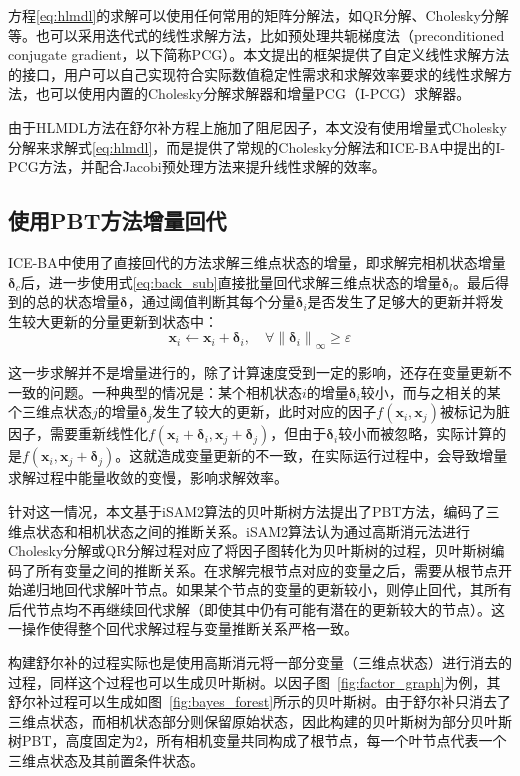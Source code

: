 方程\eqref{eq:hlmdl}的求解可以使用任何常用的矩阵分解法，如QR分解、Cholesky分解等。也可以采用迭代式的线性求解方法，比如预处理共轭梯度法（preconditioned conjugate gradient，以下简称PCG）。本文提出的框架提供了自定义线性求解方法的接口，用户可以自己实现符合实际数值稳定性需求和求解效率要求的线性求解方法，也可以使用内置的Cholesky分解求解器和增量PCG（I-PCG）求解器。

由于HLMDL方法在舒尔补方程上施加了阻尼因子，本文没有使用增量式Cholesky分解\citep{polok2013incremental}来求解式\eqref{eq:hlmdl}，而是提供了常规的Cholesky分解法和ICE-BA中提出的I-PCG方法，并配合Jacobi预处理方法\citep{jeong2012pushing}来提升线性求解的效率。

\subsection{使用PBT方法增量回代}

ICE-BA中使用了直接回代的方法求解三维点状态的增量，即求解完相机状态增量$\bm{\delta}_c$后，进一步使用式\eqref{eq:back_sub}直接批量回代求解三维点状态的增量$\bm{\delta}_l$。最后得到的总的状态增量$\bm{\delta}$，通过阈值判断其每个分量$\bm{\delta}_i$是否发生了足够大的更新并将发生较大更新的分量更新到状态中：
\begin{equation}
    \bm{x}_i \leftarrow \bm{x}_i + \bm{\delta}_i, \quad
    \forall \left\|\bm{\delta}_i\right\|_{\infty} \geq \varepsilon
\end{equation}

这一步求解并不是增量进行的，除了计算速度受到一定的影响，还存在变量更新不一致的问题。一种典型的情况是：某个相机状态$i$的增量$\bm{\delta}_i$较小，而与之相关的某个三维点状态$j$的增量$\bm{\delta}_{j}$发生了较大的更新，此时对应的因子$f(\bm{x}_i,\bm{x}_j)$被标记为脏因子，需要重新线性化$f(\bm{x}_i+\bm{\delta}_i,\bm{x}_j+\bm{\delta}_j)$，但由于$\bm{\delta}_i$较小而被忽略，实际计算的是$f(\bm{x}_i,\bm{x}_j+\bm{\delta}_j)$。这就造成变量更新的不一致，在实际运行过程中，会导致增量求解过程中能量收敛的变慢，影响求解效率。

针对这一情况，本文基于iSAM2算法的贝叶斯树方法提出了PBT方法，编码了三维点状态和相机状态之间的推断关系。iSAM2算法认为通过高斯消元法进行Cholesky分解或QR分解过程对应了将因子图转化为贝叶斯树的过程，贝叶斯树编码了所有变量之间的推断关系。在求解完根节点对应的变量之后，需要从根节点开始递归地回代求解叶节点。如果某个节点的变量的更新较小，则停止回代，其所有后代节点均不再继续回代求解（即使其中仍有可能有潜在的更新较大的节点）。这一操作使得整个回代求解过程与变量推断关系严格一致。

构建舒尔补的过程实际也是使用高斯消元将一部分变量（三维点状态）进行消去的过程，同样这个过程也可以生成贝叶斯树。以因子图~\ref{fig:factor_graph}为例，其舒尔补过程可以生成如图~\ref{fig:bayes_forest}所示的贝叶斯树。由于舒尔补只消去了三维点状态，而相机状态部分则保留原始状态，因此构建的贝叶斯树为部分贝叶斯树PBT，高度固定为$2$，所有相机变量共同构成了根节点，每一个叶节点代表一个三维点状态及其前置条件状态。

